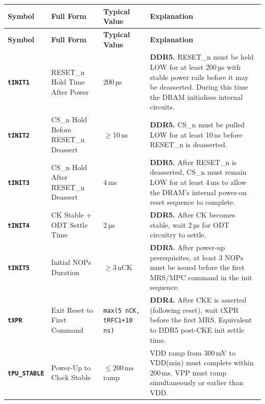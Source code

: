 \documentclass[11pt,a4paper]{article}
\newcommand{\sym}[1]{\texttt{\textbf{#1}}}
\begin{document}
\begin{longtable}{L{2.2cm} L{4.8cm} L{3.5cm} L{4cm}}
\toprule
\textbf{Symbol} & \textbf{Full Form} & \textbf{Typical Value} & \textbf{Explanation} \\
\midrule
\endfirsthead
\toprule
\textbf{Symbol} & \textbf{Full Form} & \textbf{Typical Value} & \textbf{Explanation} \\
\midrule
\endhead
\bottomrule
\endfoot

\sym{tINIT1} & RESET\_n Hold Time After Power & 200\,µs &
  \textbf{DDR5.} RESET\_n must be held LOW for at least 200\,µs with stable power rails
  before it may be deasserted. During this time the DRAM initialises internal circuits. \\

\sym{tINIT2} & CS\_n Hold Before RESET\_n Deassert & $\geq$10\,ns &
  \textbf{DDR5.} CS\_n must be pulled LOW for at least 10\,ns before RESET\_n is deasserted. \\

\sym{tINIT3} & CS\_n Hold After RESET\_n Deassert & 4\,ms &
  \textbf{DDR5.} After RESET\_n is deasserted, CS\_n must remain LOW for at least 4\,ms
  to allow the DRAM's internal power-on reset sequence to complete. \\

\sym{tINIT4} & CK Stable + ODT Settle Time & 2\,µs &
  \textbf{DDR5.} After CK becomes stable, wait 2\,µs for ODT circuitry to settle. \\

\sym{tINIT5} & Initial NOPs Duration & $\geq 3$\,nCK &
  \textbf{DDR5.} After power-up prerequisites, at least 3 NOPs must be issued before 
  the first MRS/MPC command in the init sequence. \\

\sym{tXPR} & Exit Reset to First Command & \texttt{max(5\,nCK, tRFC1+10\,ns)} &
  \textbf{DDR4.} After CKE is asserted (following reset), wait tXPR before the first MRS.
  Equivalent to DDR5 post-CKE init settle time. \\

\sym{tPU\_STABLE} & Power-Up to Clock Stable & $\leq 200\,\text{ms}$ ramp &
  VDD ramp from 300\,mV to VDD(min) must complete within 200\,ms. 
  VPP must ramp simultaneously or earlier than VDD. \\
\end{longtable}

\end{document}
